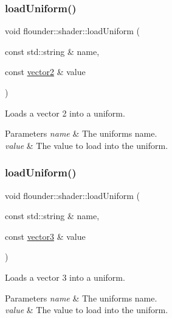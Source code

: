 \subsubsection{\texorpdfstring{load\+Uniform()}{loadUniform()}\hspace{0.1cm}{\footnotesize\ttfamily [11/13]}}
{\footnotesize\ttfamily void flounder\+::shader\+::load\+Uniform (\begin{DoxyParamCaption}\item[{const std\+::string \&}]{name,  }\item[{const \hyperlink{classflounder_1_1vector2}{vector2} \&}]{value }\end{DoxyParamCaption})}



Loads a vector 2 into a uniform. 


\begin{DoxyParams}{Parameters}
{\em name} & The uniforms name. \\
\hline
{\em value} & The value to load into the uniform. \\
\hline
\end{DoxyParams}
\mbox{\label{classflounder_1_1shader_a776ea14c9ec0e66b59e25cdc606e5bc8}} 
\subsubsection{\texorpdfstring{load\+Uniform()}{loadUniform()}\hspace{0.1cm}{\footnotesize\ttfamily [12/13]}}
{\footnotesize\ttfamily void flounder\+::shader\+::load\+Uniform (\begin{DoxyParamCaption}\item[{const std\+::string \&}]{name,  }\item[{const \hyperlink{classflounder_1_1vector3}{vector3} \&}]{value }\end{DoxyParamCaption})}



Loads a vector 3 into a uniform. 


\begin{DoxyParams}{Parameters}
{\em name} & The uniforms name. \\
\hline
{\em value} & The value to load into the uniform. \\
\hline
\end{DoxyParams}
\mbox{\label{classflounder_1_1shader_aa56085c5c7dc315f165ee3bb9d81d250}} 
